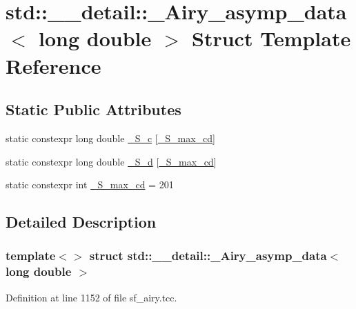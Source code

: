 \hypertarget{structstd_1_1____detail_1_1__Airy__asymp__data_3_01long_01double_01_4}{}\section{std\+:\+:\+\_\+\+\_\+detail\+:\+:\+\_\+\+Airy\+\_\+asymp\+\_\+data$<$ long double $>$ Struct Template Reference}
\label{structstd_1_1____detail_1_1__Airy__asymp__data_3_01long_01double_01_4}
\subsection*{Static Public Attributes}
\begin{DoxyCompactItemize}
\item 
static constexpr long double \hyperlink{structstd_1_1____detail_1_1__Airy__asymp__data_3_01long_01double_01_4_a563bbe7d1ef612defb41aaedcc5657fe}{\+\_\+\+S\+\_\+c} \mbox{[}\hyperlink{structstd_1_1____detail_1_1__Airy__asymp__data_3_01long_01double_01_4_a6a21ac69ffc53d33ebc346981bc52b9a}{\+\_\+\+S\+\_\+max\+\_\+cd}\mbox{]}
\item 
static constexpr long double \hyperlink{structstd_1_1____detail_1_1__Airy__asymp__data_3_01long_01double_01_4_a3c49ca222e675f3def5077e46c7d6834}{\+\_\+\+S\+\_\+d} \mbox{[}\hyperlink{structstd_1_1____detail_1_1__Airy__asymp__data_3_01long_01double_01_4_a6a21ac69ffc53d33ebc346981bc52b9a}{\+\_\+\+S\+\_\+max\+\_\+cd}\mbox{]}
\item 
static constexpr int \hyperlink{structstd_1_1____detail_1_1__Airy__asymp__data_3_01long_01double_01_4_a6a21ac69ffc53d33ebc346981bc52b9a}{\+\_\+\+S\+\_\+max\+\_\+cd} = 201
\end{DoxyCompactItemize}


\subsection{Detailed Description}
\subsubsection*{template$<$$>$\newline
struct std\+::\+\_\+\+\_\+detail\+::\+\_\+\+Airy\+\_\+asymp\+\_\+data$<$ long double $>$}



Definition at line 1152 of file sf\+\_\+airy.\+tcc.



